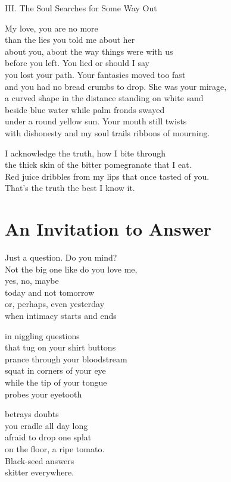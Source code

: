 \documentclass[twoside,10pt]{book}
\begin{document}
III.  The Soul Searches for Some Way Out

My love, you are no more\\
than the lies you told me about her\\
about you, about the way things were with us\\
before you left. You lied or should I say\\
you lost your path. Your fantasies moved too fast\\
and you had no bread crumbs to drop. She was your mirage,\\
a curved shape in the distance standing on white sand\\
beside blue water while palm fronds swayed\\
under a round yellow sun. Your mouth still twists\\
with dishonesty and my soul trails ribbons of mourning.

I acknowledge the truth, how I bite through\\
the thick skin of the bitter pomegranate that I eat.\\
Red juice dribbles from my lips that once tasted of you.\\
That's the truth the best I know it.


\clearpage
\section{An Invitation to Answer}

Just a question. Do you mind?\\
Not the big one like do you love me,\\
yes, no, maybe\\
today and not tomorrow\\
or, perhaps, even yesterday\\
when intimacy starts and ends

in niggling questions\\
that tug on your shirt buttons\\
prance through your bloodstream\\
squat in corners of your eye\\
while the tip of your tongue\\
probes your eyetooth

betrays doubts\\
you cradle all day long\\
afraid to drop one splat\\
on the floor, a ripe tomato.\\
Black-seed answers\\
skitter everywhere.
\end{document}
